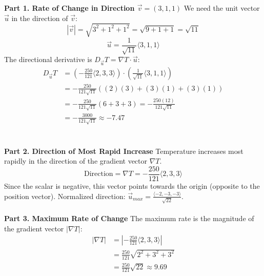 \documentclass{article}
\begin{document}
\textbf{Part 1. Rate of Change in Direction $\vec{v} = (3,1,1)$}
We need the unit vector $\vec{u}$ in the direction of $\vec{v}$:
\[
	|\vec{v}| = \sqrt{3^2 + 1^2 + 1^2} = \sqrt{9+1+1} = \sqrt{11}
\]
\[
	\vec{u} = \frac{1}{\sqrt{11}}\langle 3, 1, 1 \rangle
\]
The directional derivative is $D_{\vec{u}}T = \nabla T \cdot \vec{u}$:
\begin{align*}
	D_{\vec{u}}T & = \left( -\frac{250}{121} \langle 2, 3, 3 \rangle \right) \cdot \left( \frac{1}{\sqrt{11}} \langle 3, 1, 1 \rangle \right) \\
	             & = -\frac{250}{121\sqrt{11}} \left( (2)(3) + (3)(1) + (3)(1) \right)                                                        \\
	             & = -\frac{250}{121\sqrt{11}} (6 + 3 + 3) = -\frac{250(12)}{121\sqrt{11}}                                                    \\
	             & = -\frac{3000}{121\sqrt{11}} \approx -7.47
\end{align*}
\\
\\
\textbf{Part 2. Direction of Most Rapid Increase}
Temperature increases most rapidly in the direction of the gradient vector $\nabla T$.
\[
	\text{Direction} = \nabla T = -\frac{250}{121} \langle 2, 3, 3 \rangle
\]
Since the scalar is negative, this vector points towards the origin (opposite to the position vector).
Normalized direction: $\vec{u}_{max} = \frac{\langle -2, -3, -3 \rangle}{\sqrt{22}}$.
\\
\\
\textbf{Part 3. Maximum Rate of Change}
The maximum rate is the magnitude of the gradient vector $|\nabla T|$:
\begin{align*}
	|\nabla T| & = \left| -\frac{250}{121} \langle 2, 3, 3 \rangle \right| \\
	           & = \frac{250}{121} \sqrt{2^2 + 3^2 + 3^2}                  \\
	           & = \frac{250}{121} \sqrt{22} \approx 9.69
\end{align*}

\pagebreak

\end{document}
